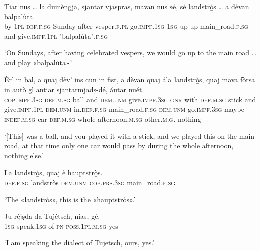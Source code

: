 \begin{linenumbers}
\gll    Tiar nus … la dumèngja, sjantar vjaspras, mavan nus sé, sé  landstrò̱s … a dèvan balpalùta.\\
by \textsc{1pl} {} \textsc{def.f.sg} Sunday  after vesper.\textsc{f.pl} go.\textsc{impf.1sg} \textsc{1sg} up up main\_road.\textsc{f.sg} {} and give.\textsc{impf.1pl} "balpalùta".\textsc{f.sg}\\
\end{linenumbers}
\medskip
\glt `On Sundays, after having celebrated vespers, we would go up to the main road … and play «balpalùta».'
\medskip

\begin{linenumbers}
\gll    Èr’ in bal, a quaj dèv’ ins cun in fist, a dèvan quaj ála  landstrò̱s, quaj mava fòrsa in autò gl antiar sjantarmjadṣ-dé, áutar nuét.\\
 \textsc{cop.impf.3sg} \textsc{def.m.sg} ball and \textsc{dem.unm} give.\textsc{impf.3sg} \textsc{gnr} with \textsc{def.m.sg} stick and give.\textsc{impf.1pl} \textsc{dem.unm} in.\textsc{def.f.sg} main\_road.\textsc{f.sg}  \textsc{dem.unm} go.\textsc{impf.3sg} maybe \textsc{indef.m.sg} car \textsc{def.m.sg} whole afternoon.\textsc{m.sg} other.\textsc{m.g.} nothing\\
\end{linenumbers}
\medskip
\glt `[This] was a ball, and you played it with a stick, and we played this on the main road, at that time only one car would pass by during the whole afternoon, nothing else.'
\medskip


\begin{linenumbers}
\gll La landstrò̱s, quaj è hauptstrò̱s.\footnotemark\\
 \textsc{def.f.sg} landstròs \textsc{dem.unm} \textsc{cop.prs.3sg} main\_road.\textsc{f.sg}\\
\end{linenumbers}
\medskip
\glt `The «landstròs», this is the «hauptstròs».'
\medskip

\begin{linenumbers}
\gll   Ju réjṣda da Tujétsch, nias, gè. \\
\textsc{1sg} speak.\textsc{1sg} of \textsc{pn} \textsc{poss.1pl.m.sg} yes  \\
\end{linenumbers}
\medskip
\glt `I am speaking the dialect of Tujetsch, ours, yes.'
\medskip

